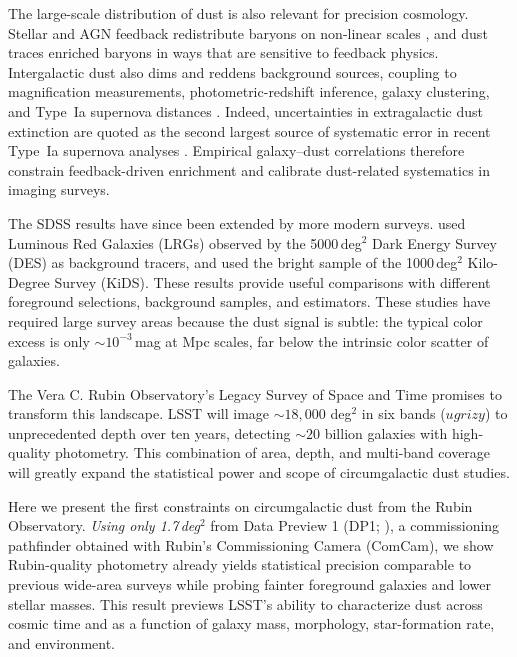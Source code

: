 \documentclass[linenumbers, twocolumn]{aastex701}
\begin{document}
The large-scale distribution of dust is also relevant for precision cosmology.
Stellar and AGN feedback redistribute baryons on non-linear scales \citep{chisari2019}, and dust traces enriched baryons in ways that are sensitive to feedback physics.
Intergalactic dust also dims and reddens background sources, coupling to magnification measurements, photometric-redshift inference, galaxy clustering, and Type~Ia supernova distances \citep{aguirre1999,mortsell2003,menard2010,menard2010sn,goobar2018}.
Indeed, uncertainties in extragalactic dust extinction are quoted as the second largest source of systematic error in recent Type~Ia supernova analyses \citep{rubin2025}.
Empirical galaxy--dust correlations therefore constrain feedback-driven enrichment and calibrate dust-related systematics in imaging surveys.

The SDSS results have since been extended by more modern surveys.
\citet{mccleary2025} used Luminous Red Galaxies (LRGs) observed by the 5000\,deg$^2$ Dark Energy Survey (DES) as background tracers, and \citet{genc2025} used the bright sample of the 1000\,deg$^2$ Kilo-Degree Survey (KiDS).
These results provide useful comparisons with different foreground selections, background samples, and estimators.
These studies have required large survey areas because the dust signal is subtle: the typical color excess is only $\sim 10^{-3}$\,mag at Mpc scales, far below the intrinsic color scatter of galaxies.

The Vera C. Rubin Observatory's Legacy Survey of Space and Time \citep[LSST;][]{ivezic2019} promises to transform this landscape.
LSST will image $\sim18,000$ deg$^2$ in six bands ($ugrizy$) to unprecedented depth over ten years, detecting $\sim20$ billion galaxies with high-quality photometry.
This combination of area, depth, and multi-band coverage will greatly expand the statistical power and scope of circumgalactic dust studies.

Here we present the first constraints on circumgalactic dust from the Rubin Observatory.
\textit{Using only 1.7\,deg$^2$} from Data Preview 1 (DP1; \citealt{dp1}), a commissioning pathfinder obtained with Rubin's Commissioning Camera (ComCam), we show Rubin-quality photometry already yields statistical precision comparable to previous wide-area surveys while probing fainter foreground galaxies and lower stellar masses.
This result previews LSST's ability to characterize dust across cosmic time and as a function of galaxy mass, morphology, star-formation rate, and environment.
\end{document}
